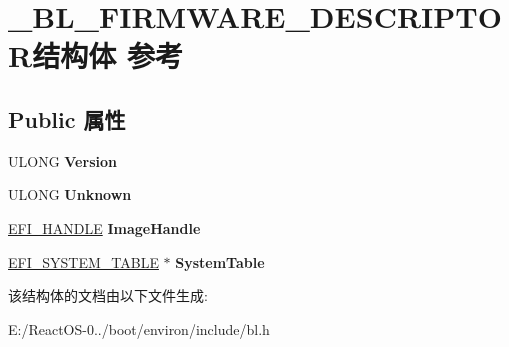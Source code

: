 \hypertarget{struct___b_l___f_i_r_m_w_a_r_e___d_e_s_c_r_i_p_t_o_r}{}\section{\+\_\+\+B\+L\+\_\+\+F\+I\+R\+M\+W\+A\+R\+E\+\_\+\+D\+E\+S\+C\+R\+I\+P\+T\+O\+R结构体 参考}
\label{struct___b_l___f_i_r_m_w_a_r_e___d_e_s_c_r_i_p_t_o_r}
\subsection*{Public 属性}
\begin{DoxyCompactItemize}
\item 
\mbox{\label{struct___b_l___f_i_r_m_w_a_r_e___d_e_s_c_r_i_p_t_o_r_a3c13e7911676329715c3be835c7c042c}} 
U\+L\+O\+NG {\bfseries Version}
\item 
\mbox{\label{struct___b_l___f_i_r_m_w_a_r_e___d_e_s_c_r_i_p_t_o_r_a115a0255f13724006d0937aefc57afd9}} 
U\+L\+O\+NG {\bfseries Unknown}
\item 
\mbox{\label{struct___b_l___f_i_r_m_w_a_r_e___d_e_s_c_r_i_p_t_o_r_a328b8b2277bbec3687df9552a12204b1}} 
\hyperlink{_uefi_base_type_8h_af943d518ce8a229e7e51ce3fed0e3122}{E\+F\+I\+\_\+\+H\+A\+N\+D\+LE} {\bfseries Image\+Handle}
\item 
\mbox{\label{struct___b_l___f_i_r_m_w_a_r_e___d_e_s_c_r_i_p_t_o_r_a6916e80127b95def84ef461ebb4e7eb1}} 
\hyperlink{struct_e_f_i___s_y_s_t_e_m___t_a_b_l_e}{E\+F\+I\+\_\+\+S\+Y\+S\+T\+E\+M\+\_\+\+T\+A\+B\+LE} $\ast$ {\bfseries System\+Table}
\end{DoxyCompactItemize}


该结构体的文档由以下文件生成\+:\begin{DoxyCompactItemize}
\item 
E\+:/\+React\+O\+S-\/0../boot/environ/include/bl.\+h\end{DoxyCompactItemize}
